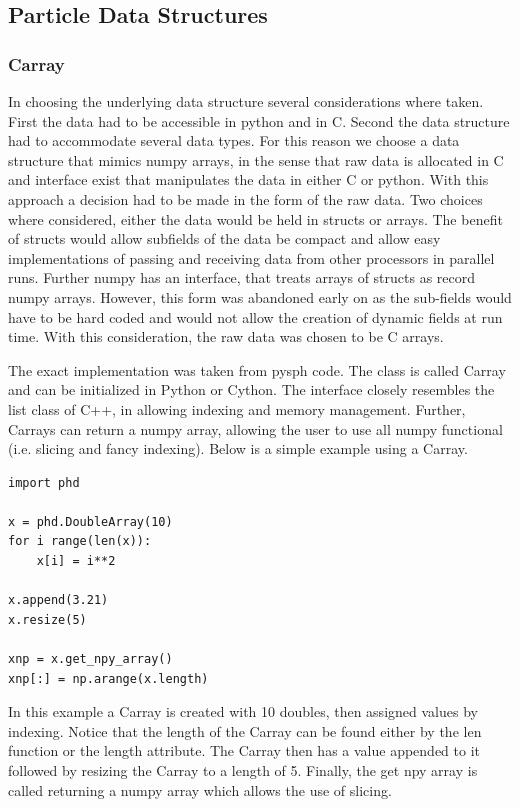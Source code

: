 \subsection{Particle Data Structures}
\subsubsection{Carray}
In choosing the underlying data structure several considerations where taken. First the
data had to be accessible in python and in C. Second the data structure had to
accommodate several data types. For this reason we choose a data structure that mimics
numpy arrays, in the sense that raw data is allocated in C and interface exist that
manipulates the data in either C or python. With this approach a decision had to be
made in the form of the raw data. Two choices where considered, either the data would
be held in structs or arrays. The benefit of structs would allow subfields of the data
be compact and allow easy implementations of passing and receiving data from other
processors in parallel runs. Further numpy has an interface, that treats
arrays of structs as record numpy arrays. However, this form was abandoned early on
as the sub-fields would have to be hard coded and would not allow the creation of
dynamic fields at run time. With this consideration, the raw data was chosen to be
C arrays. 

The exact implementation was taken from pysph code. The class is called Carray and
can be initialized in Python or Cython. The interface closely resembles the list
class of C++, in allowing indexing and memory management. Further, Carrays can return
a numpy array, allowing the user to use all numpy functional (i.e. slicing and fancy indexing). 
Below is a simple example using a Carray.
\begin{lstlisting}
import phd

x = phd.DoubleArray(10)
for i range(len(x)):
	x[i] = i**2
    
x.append(3.21)
x.resize(5)

xnp = x.get_npy_array()
xnp[:] = np.arange(x.length)
\end{lstlisting}
In this example a Carray is created with 10 doubles, then assigned values by indexing. Notice
that the length of the Carray can be found either by the len function or the length
attribute. The Carray then has a value appended to it followed by resizing the Carray to a length
of 5. Finally, the get npy array is called returning a numpy array which allows the use of slicing.

